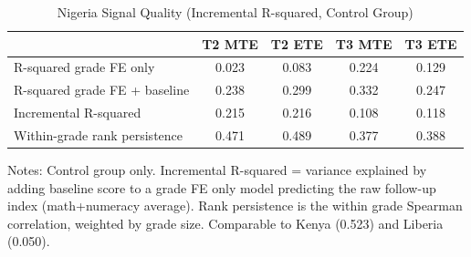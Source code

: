 \begin{table}[!htbp]
\centering
\caption{Nigeria Signal Quality (Incremental R-squared, Control Group)}
\label{tab:ng_signal_quality}
\begin{threeparttable}
\begin{tabular}[t]{lcccc}
\toprule
 & T2 MTE & T2 ETE & T3 MTE & T3 ETE \\
\midrule
R-squared grade FE only &  0.023 &  0.083 &  0.224 &  0.129 \\
R-squared grade FE + baseline &  0.238 &  0.299 &  0.332 &  0.247 \\
Incremental R-squared &  0.215 &  0.216 &  0.108 &  0.118 \\
Within-grade rank persistence &  0.471 &  0.489 &  0.377 &  0.388 \\
\bottomrule
\end{tabular}
\begin{tablenotes}[para]
\item Notes: Control group only. Incremental R-squared = variance explained by adding baseline score to a grade FE only model predicting the raw follow-up index (math+numeracy average). Rank persistence is the within grade Spearman correlation, weighted by grade size. Comparable to Kenya (0.523) and Liberia (0.050).
\end{tablenotes}
\end{threeparttable}
\end{table}
